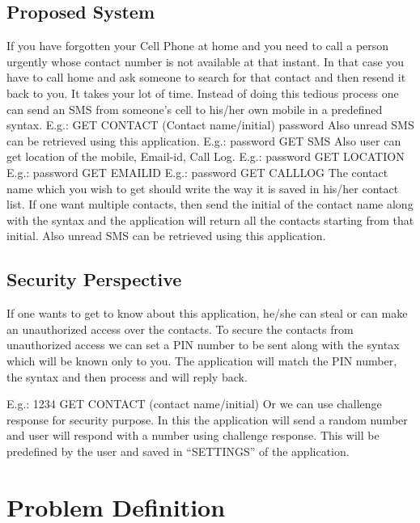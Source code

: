 \subsection{Proposed System}
\hspace{0.9cm}If you have forgotten your Cell Phone at home and you need to call a person urgently whose contact number is not available at that instant. In that case you have to call home and ask someone to search for that contact and then resend it back to you. It takes your lot of time. Instead of doing this tedious process one can send an SMS from someone’s cell to his/her own mobile in a predefined syntax.
E.g.: GET CONTACT (Contact name/initial) password
Also unread SMS can be retrieved using this application.
E.g.: password GET SMS 
Also user can get location of the mobile, Email-id, Call Log.
E.g.: password GET LOCATION 
E.g.: password GET EMAILID 
E.g.: password GET CALLLOG 
The contact name which you wish to get should write
the way it is saved in his/her contact list. If one want
multiple contacts, then send the initial of the contact
name along with the syntax and the application will
return all the contacts starting from that initial.
Also unread SMS can be retrieved using this
application. 

\subsection{Security Perspective}
\hspace{0.9cm}If one wants to get to know about this application,
he/she can steal or can make an unauthorized access
over the contacts. To secure the contacts from
unauthorized access we can set a PIN number to be
sent along with the syntax which will be known only
to you. The application will match the PIN number,
the syntax and then process and will reply back.

E.g.: 1234 GET CONTACT (contact name/initial)
Or we can use challenge response for security
purpose. In this the application will send a random
number and user will respond with a number using
challenge response. This will be predefined by the
user and saved in “SETTINGS” of the application. 

\section{Problem Definition}

